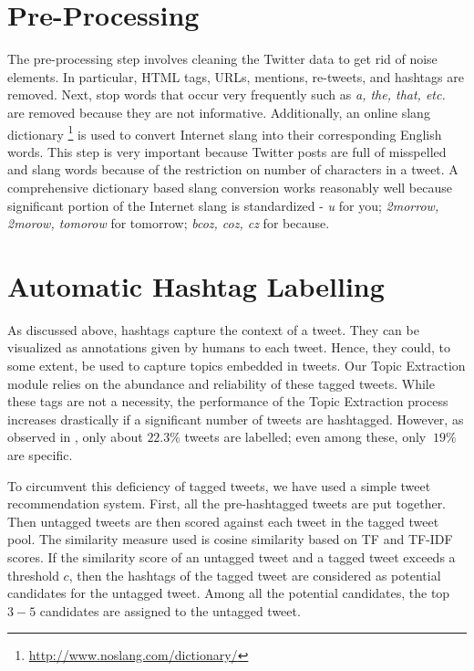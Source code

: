 \section{Pre-Processing}
The pre-processing step involves cleaning the Twitter data to get rid of noise elements. In particular, HTML tags, URLs, \@user mentions, re-tweets, and hashtags are removed. Next, stop words that occur very frequently such as \textit{a, the, that, etc.} are removed because they are not informative. Additionally, an online slang dictionary \footnote{\url{http://www.noslang.com/dictionary/}} is used to convert Internet slang into their corresponding English words. This step is very important because Twitter posts are full of misspelled and slang words because of the restriction on number of characters in a tweet. A comprehensive dictionary based slang conversion works reasonably well because significant portion of the Internet slang is standardized - \textit{u} for you; \textit{2morrow, 2morow, tomorow} for tomorrow; \textit{bcoz, coz, cz} for because.

\section{Automatic Hashtag Labelling}
As discussed above, hashtags capture the context of a tweet. They can be visualized as annotations given by humans to each tweet. Hence, they could, to some extent, be used to capture topics embedded in tweets. Our Topic Extraction module relies on the abundance and reliability of these tagged tweets. While these tags are not a necessity, the performance of the Topic Extraction process increases drastically if a significant number of tweets are hashtagged. However, as observed in \cite{mehrotra2013improving}, only about $22.3\%$ tweets are labelled; even among these, only $~19\%$ are specific.

To circumvent this deficiency of tagged tweets, we have used a simple tweet recommendation system. First, all the pre-hashtagged tweets are put together. Then untagged tweets are then scored against each tweet in the tagged tweet pool. The similarity measure used is cosine similarity based on TF and TF-IDF scores. If the similarity score of an untagged tweet and a tagged tweet exceeds a threshold $c$, then the hashtags of the tagged tweet are considered as potential candidates for the untagged tweet. Among all the potential candidates, the top $3-5$ candidates are assigned to the untagged tweet.

